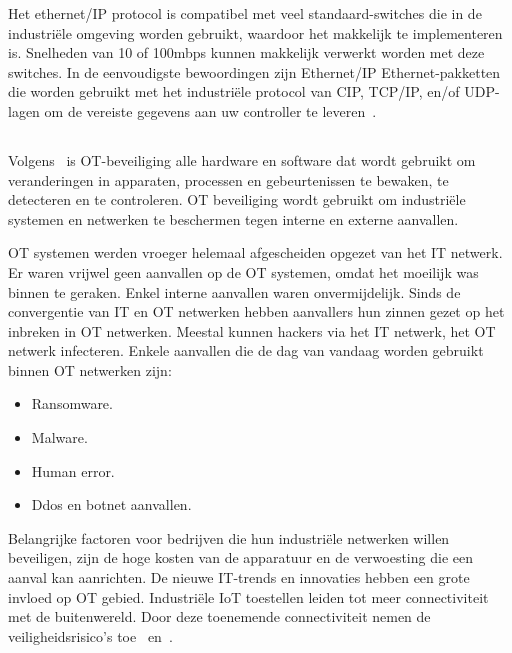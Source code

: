 Het ethernet/IP protocol is compatibel met veel standaard-switches die in de industriële omgeving worden gebruikt, waardoor het makkelijk te implementeren is. Snelheden van 10 of 100mbps kunnen makkelijk verwerkt worden met deze switches. In de eenvoudigste bewoordingen zijn Ethernet/IP Ethernet-pakketten die worden gebruikt met het industriële protocol van CIP, TCP/IP, en/of UDP-lagen om de vereiste gegevens aan uw controller te leveren~\autocite{Realpars2019a}.

\subsection{}
\label{subsec:OT security}
\subsubsection{}
\label{subsec:Wat valt er onder OT security?}
Volgens~\textcite{Infradata2019} is OT-beveiliging alle hardware en software dat wordt gebruikt om veranderingen in apparaten, processen en gebeurtenissen te bewaken, te detecteren en te controleren. OT beveiliging wordt gebruikt om industriële systemen en netwerken te beschermen tegen interne en externe aanvallen. 

OT systemen werden vroeger helemaal afgescheiden opgezet van het IT netwerk. Er waren vrijwel geen aanvallen op de OT systemen, omdat het moeilijk was binnen te geraken. Enkel interne aanvallen waren onvermijdelijk. Sinds de convergentie van IT en OT netwerken hebben aanvallers hun zinnen gezet op het inbreken in OT netwerken. Meestal kunnen hackers via het IT netwerk, het OT netwerk infecteren. Enkele aanvallen die de dag van vandaag worden gebruikt binnen OT netwerken zijn:
\begin{itemize}
    \item Ransomware.
    \item Malware.
    \item Human error.
    \item Ddos en botnet aanvallen.
\end{itemize}
Belangrijke factoren voor bedrijven die hun industriële netwerken willen beveiligen, zijn de hoge kosten van de apparatuur en de verwoesting die een aanval kan aanrichten. De nieuwe IT-trends en innovaties hebben een grote invloed op OT gebied. Industriële IoT toestellen leiden tot meer connectiviteit met de buitenwereld. Door deze toenemende connectiviteit nemen de veiligheidsrisico's toe~\autocite{Infradata2019} en~\autocite{Security2020}.

